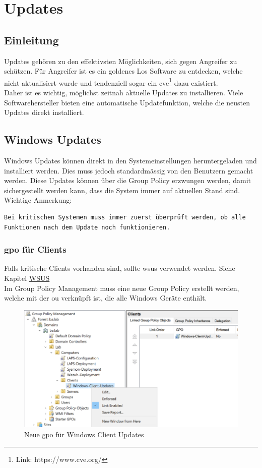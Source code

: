 \chapter{Updates}
\section{Einleitung}
Updates gehören zu den effektivsten Möglichkeiten, sich gegen Angreifer zu schützen.
Für Angreifer ist es ein goldenes Los Software zu entdecken, welche nicht aktualisiert wurde und tendenziell sogar ein \acrfull{cve}\footnote{Link: https://www.cve.org/} dazu existiert.\\

Daher ist es wichtig, möglichst zeitnah aktuelle Updates zu installieren.
Viele Softwarehersteller bieten eine automatische Updatefunktion, welche die neusten Updates direkt installiert.

\section{Windows Updates}
Windows Updates können direkt in den Systemeinstellungen heruntergeladen und installiert werden.
Dies muss jedoch standardmässig von den Benutzern gemacht werden.
Diese Updates können über die Group Policy erzwungen werden, damit sichergestellt werden kann, dass die System immer auf aktuellen Stand sind.\\

Wichtige Anmerkung:
\begin{lstlisting}
Bei kritischen Systemen muss immer zuerst überprüft werden, ob alle Funktionen nach dem Update noch funktionieren.
\end{lstlisting}

\subsection{\acrshort{gpo} für Clients}
Falls kritische Clients vorhanden sind, sollte \acrfull{wsus} verwendet werden. Siehe Kapitel \hyperref[subsec:wsus]{WSUS}\\

Im Group Policy Management muss eine neue Group Policy erstellt werden, welche mit der \acrshort{ou} verknüpft ist, die alle Windows Geräte enthält.
\begin{figure}[H]
    \centering
    \includegraphics[width=0.7\linewidth]{../img/Updates/edit-gpo-clinets.png}
    \caption{Neue \acrshort{gpo} für Windows Client Updates}
\end{figure}

